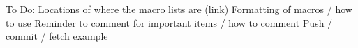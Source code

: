

To Do:
Locations of where the macro lists are (link)
Formatting of macros / how to use
Reminder to comment for important items / how to comment
Push / commit / fetch example


